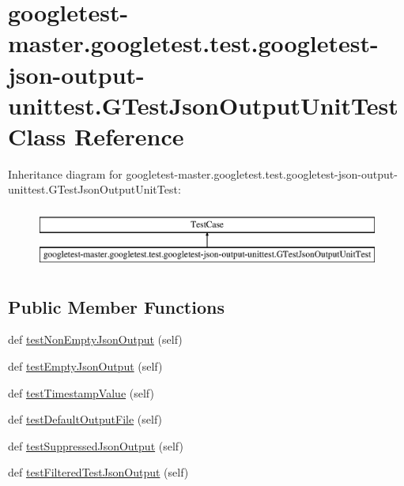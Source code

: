 \hypertarget{classgoogletest-master_1_1googletest_1_1test_1_1googletest-json-output-unittest_1_1_g_test_json_output_unit_test}{}\section{googletest-\/master.googletest.\+test.\+googletest-\/json-\/output-\/unittest.G\+Test\+Json\+Output\+Unit\+Test Class Reference}
\label{classgoogletest-master_1_1googletest_1_1test_1_1googletest-json-output-unittest_1_1_g_test_json_output_unit_test}
Inheritance diagram for googletest-\/master.googletest.\+test.\+googletest-\/json-\/output-\/unittest.G\+Test\+Json\+Output\+Unit\+Test\+:\begin{figure}[H]
\begin{center}
\leavevmode
\includegraphics[height=2.000000cm]{d6/d49/classgoogletest-master_1_1googletest_1_1test_1_1googletest-json-output-unittest_1_1_g_test_json_output_unit_test}
\end{center}
\end{figure}
\subsection*{Public Member Functions}
\begin{DoxyCompactItemize}
\item 
def \mbox{\hyperlink{classgoogletest-master_1_1googletest_1_1test_1_1googletest-json-output-unittest_1_1_g_test_json_output_unit_test_a9ac5e056f6346ba97c5b13c8840ed6bb}{test\+Non\+Empty\+Json\+Output}} (self)
\item 
def \mbox{\hyperlink{classgoogletest-master_1_1googletest_1_1test_1_1googletest-json-output-unittest_1_1_g_test_json_output_unit_test_a71068c29294e2b2d4b32c78fab82a505}{test\+Empty\+Json\+Output}} (self)
\item 
def \mbox{\hyperlink{classgoogletest-master_1_1googletest_1_1test_1_1googletest-json-output-unittest_1_1_g_test_json_output_unit_test_a31863215ce6d1273c347ad76b54a78d5}{test\+Timestamp\+Value}} (self)
\item 
def \mbox{\hyperlink{classgoogletest-master_1_1googletest_1_1test_1_1googletest-json-output-unittest_1_1_g_test_json_output_unit_test_ad526b30b1918782d755e12de9d201696}{test\+Default\+Output\+File}} (self)
\item 
def \mbox{\hyperlink{classgoogletest-master_1_1googletest_1_1test_1_1googletest-json-output-unittest_1_1_g_test_json_output_unit_test_a6db33a1cd2e65bf41fb5aa136833a830}{test\+Suppressed\+Json\+Output}} (self)
\item 
def \mbox{\hyperlink{classgoogletest-master_1_1googletest_1_1test_1_1googletest-json-output-unittest_1_1_g_test_json_output_unit_test_a3b37c4ad862cd7126b9e2bf6907574d7}{test\+Filtered\+Test\+Json\+Output}} (self)
\end{DoxyCompactItemize}
